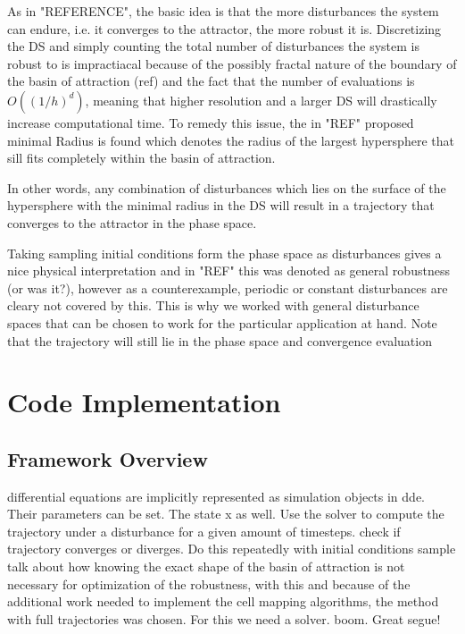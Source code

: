     As in "REFERENCE", the basic idea is that the more disturbances the system can endure, i.e. it converges to the attractor, the more robust it is. Discretizing the DS and simply counting the total number of disturbances the system is robust to is impractiacal because of the possibly fractal nature of the boundary of the basin of attraction (ref) and the fact that the number of evaluations is $O((1/h)^d)$, meaning that higher resolution and a larger DS will drastically increase computational time. To remedy this issue, the in "REF" proposed minimal Radius is found which denotes the radius of the largest hypersphere that sill fits completely within the basin of attraction.

    In other words, any combination of disturbances which lies on the surface of the hypersphere with the minimal radius in the DS will result in a trajectory that converges to the attractor in the phase space. 

    Taking sampling initial conditions form the phase space as disturbances gives a nice physical interpretation and in "REF" this was denoted as general robustness (or was it?), however as a counterexample, periodic or constant disturbances are cleary not covered by this. 
    This is why we worked with general disturbance spaces that can be chosen to work for the particular application at hand. 
    Note that the trajectory will still lie in the phase space and convergence evaluation 



\section{Code Implementation}

\subsection{Framework Overview}


differential equations are implicitly represented as simulation objects in dde. Their parameters can be set. The state x as well. Use the solver to compute the trajectory under a disturbance for a given amount of timesteps. check if trajectory converges or diverges. Do this repeatedly with initial conditions sample
talk about how knowing the exact shape of the basin of attraction is not necessary for optimization of the robustness, with this and because of the additional work needed to implement the cell mapping algorithms, the method with full trajectories was chosen. For this we need a solver. boom. Great segue!

